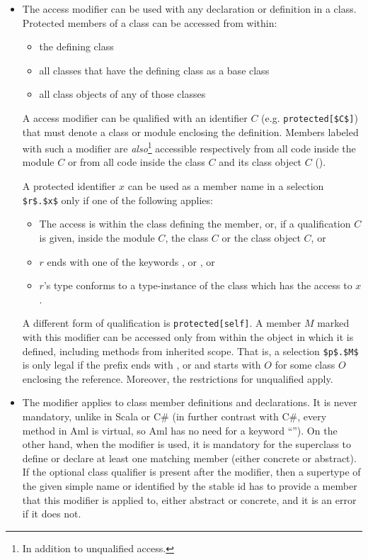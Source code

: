 \begin{itemize}
  \item The  access modifier can be used with any declaration or definition in a class. Protected members of a class can be accessed from within: 
  \begin{itemize}
    \item the defining class
    \item all classes that have the defining class as a base class
    \item all class objects of any of those classes
  \end{itemize}

  A  access modifier can be qualified with an identifier $C$ (e.g. \lstinline!protected[$C$]!) that must denote a class or module enclosing the definition. Members labeled with such a modifier are {\em also}\footnote{In addition to unqualified  access.} accessible respectively from all code inside the module $C$ or from all code inside the class $C$ and its class object $C$ (). 

  A protected identifier $x$ can be used as a member name in a selection \lstinline!$r$.$x$! only if one of the following applies: 
  \begin{itemize}
    \item The access is within the class defining the member, or, if a qualification $C$ is given, inside the module $C$, the class $C$ or the class object $C$, or
    \item $r$ ends with one of the keywords ,  or , or
    \item $r$'s type conforms to a type-instance of the class which has the access to $x$. 
  \end{itemize}

  A different form of qualification is \lstinline!protected[self]!. A member $M$ marked with this modifier can be accessed only from within the object in which it is defined, including methods from inherited scope. That is, a selection \lstinline!$p$.$M$! is only legal if the prefix ends with ,  or  and starts with $O$ for some class $O$ enclosing the reference. Moreover, the restrictions for unqualified  apply. 

  \item The  modifier applies to class member definitions and declarations. It is never mandatory, unlike in Scala or C\# (in further contrast with C\#, every method in Aml is virtual, so Aml has no need for a keyword ``''). On the other hand, when the modifier is used, it is mandatory for the superclass to define or declare at least one matching member (either concrete or abstract). If the optional class qualifier is present after the  modifier, then a supertype of the given simple name or identified by the stable id has to provide a member that this modifier is applied to, either abstract or concrete, and it is an error if it does not. 


\end{itemize}
